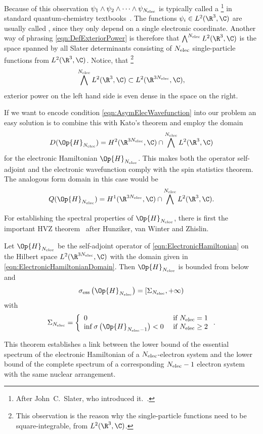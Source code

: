 Because of this observation $\psi_1 \wedge \psi_2 \wedge \cdots \wedge \psi_{N_\text{elec}}$
is typically called a %
\footnote{After John~C.~Slater, who introduced it.~\cite{Slater1929,Slater1930a}.}
in standard quantum-chemistry textbooks~\cite{Szabo1996,Helgaker2013}.
The functions $\psi_i \in L^2(\R^3, \C)$
are usually called ,
since they only depend on a single electronic coordinate.
Another way of phrasing \eqref{eqn:DefExteriorPower}
is therefore that $\bigwedge^{\Nelec} L^2(\R^3, \C)$
is the space spanned by all Slater determinants
consisting of $N_\text{elec}$ single-particle functions from $L^2(\R^3, \C)$.
Notice, that%
\footnote{%
	This observation is the reason why the single-particle functions
	need to be square-integrable, \ie from $L^2(\R^3, \C)$.
}
\[ \bigwedge^{\Nelec} L^2(\R^3, \C) \subset L^2(\R^{3\Nelec}, \C), \]
exterior power on the left hand side is even dense in the space on the right.

If we want to encode condition \eqref{eqn:AsymElecWavefunction}
into our problem an easy solution is to combine this with Kato's theorem
and employ the domain
\begin{equation}
	D(\Op{H}_{\Nelec}) = H^2(\R^{3\Nelec}, \C) \cap \bigwedge^{\Nelec} L^2(\R^3, \C)
	\label{eqn:ElectronicHamiltonianDomain}
\end{equation}
for the electronic Hamiltonian $\Op{H}_{\Nelec}$.
This makes both the operator self-adjoint and the electronic wavefunction
comply with the spin statistics theorem.
The analogous form domain in this case would be
\[ Q(\Op{H}_{\Nelec}) = H^1(\R^{3\Nelec}, \C) \cap \bigwedge^{\Nelec} L^2(\R^3, \C). \]

For establishing the spectral properties of $\Op{H}_{\Nelec}$,
there is first the important HVZ theorem~\cite{Zhislin1959,Zhislin1960,Reed1978,Teschl2014}
after Hunziker, van Winter and Zhislin.
\begin{thm}[HVZ]
	\label{thm:HVZ}
	Let $\Op{H}_{\Nelec}$ be the self-adjoint operator of \eqref{eqn:ElectronicHamiltonian}
	on the Hilbert space $L^2(\R^{3\Nelec}, \C)$
	with the domain given in \eqref{eqn:ElectronicHamiltonianDomain}.
	Then $\Op{H}_{\Nelec}$ is bounded from below and
	\[ \sigma_\text{ess}\left(\Op{H}_{\Nelec}\right) = [\Sigma_{\Nelec}, +\infty) \]
	with
	\[ \Sigma_{\Nelec} = \left\{
		\begin{array}{ll}
			0 & \text{ if $\Nelec = 1$} \\
			\inf \sigma\left(\Op{H}_{\Nelec-1}\right) < 0 & \text{ if $\Nelec \geq 2$}
		\end{array}
		\right. .
	\]
\end{thm}
This theorem establishes a link between
the lower bound of the essential spectrum
of the electronic Hamiltonian of a $N_\text{elec}$-electron system
and the lower bound of the complete spectrum of
a corresponding $N_\text{elec} - 1$ electron system
with the same nuclear arrangement.

